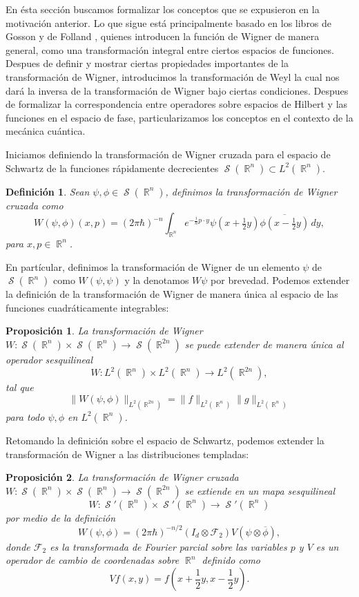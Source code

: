 \documentclass[a4paper]{report}
\DeclareMathOperator{\R}{\mathbb{R}}
\DeclareMathOperator{\Sz}{\mathcal S}
\newtheorem{definition}{Definición}
\newtheorem{proposition}{Proposición}
\begin{document}
  En ésta sección buscamos formalizar los conceptos que se
  expusieron en la motivación anterior. Lo que sigue está
  principalmente basado en los libros de Gosson
  \cite{gossonWignerTransform2017} y de Folland
  \cite{follandHarmonicAnalysisPhase1989}, quienes
  introducen la función de Wigner de manera general, como
  una transformación integral entre ciertos espacios de
  funciones. Despues de definir y mostrar ciertas
  propiedades importantes de la transformación de Wigner,
  introducimos la transformación de Weyl la cual nos dará la
  inversa de la transformación de Wigner bajo ciertas
  condiciones. Despues de formalizar la correspondencia
  entre operadores sobre espacios de Hilbert y las funciones
  en el espacio de fase, particularizamos los conceptos en
  el contexto de la mecánica cuántica. 

  Iniciamos definiendo la transformación de Wigner cruzada
  para el espacio de Schwartz de la funciones rápidamente
  decrecientes $\Sz(\R^{n}) \subset L^2(\R^{n})$.
  \begin{definition}
    Sean $\psi, \phi \in \Sz(\R^{n})$, definimos la
    transformación de Wigner cruzada como
    \begin{equation}
      \label{eqn:cross_wigner_transform}
      W(\psi,\phi)(x,p)
      = (2\pi\hbar)^{-n} \int_{\R^{n}} e^{-\frac{i}{\hbar} p
      \cdot y} \psi(x + \tfrac{1}{2}y) \overline{\phi(x -
      \tfrac{1}{2}y)} \, dy,
    \end{equation}
    para $x,p \in \R^{n}$.
  \end{definition}
  En partícular, definimos la transformación de Wigner de un
  elemento $\psi$ de $\Sz(\R^{n})$ como $W(\psi,\psi)$ y la
  denotamos $W\psi$ por brevedad. Podemos extender la
  definición de la transformación de Wigner de manera única
  al espacio de las funciones cuadráticamente integrables:
  \begin{proposition}
    La transformación de Wigner $W : \Sz(\R^{n}) \times
    \Sz(\R^{n}) \to \Sz(\R^{2n})$ se puede extender de
    manera única al operador sesquilineal
    \[
      W : L^2(\R^{n}) \times L^2(\R^{n}) \to L^2(\R^{2n}),
    \] 
    tal que
    \[
      \|W(\psi,\phi)\|_{L^2(\R^{2n})}
      = \|f\|_{L^2(\R^{n})} \|g\|_{L^2(\R^{n})}
    \] 
    para todo $\psi, \phi$ en  $L^2(\R^{n})$.
  \end{proposition}
  Retomando la definición sobre el espacio de Schwartz,
  podemos extender la transformación de Wigner a las
  distribuciones templadas:
  \begin{proposition}
    La transformación de Wigner cruzada $W : \Sz(\R^{n})
    \times \Sz(\R^{n}) \to \Sz(\R^{2n})$ se extiende en un
    mapa sesquilineal
    \[
      W : \Sz'(\R^{n}) \times \Sz'(\R^{n}) \to \Sz'(\R^{n})
    \] 
    por medio de la definición
    \[
      W(\psi,\phi)
      = (2\pi\hbar)^{-n / 2} (I_d \otimes \mathcal F_2)
      V(\psi \otimes \overline{\phi}),
    \] 
    donde $\mathcal F_2$ es la transformada de Fourier
    parcial sobre las variables $p$ y $V$ es un operador de
    cambio de coordenadas sobre $\R^{n}$ definido como
    \[
      Vf(x,y) = f\left( x + \frac{1}{2}y, x - \frac{1}{2}y
      \right).
    \] 
  \end{proposition}
\end{document}
